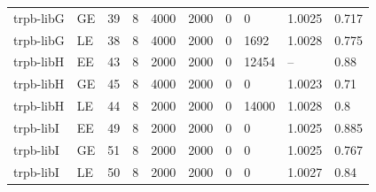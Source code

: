 \begin{longtable}[c]{llllllllll}
trpb-libG & GE & 39 & 8 & 4000 & 2000 & 0 & 0 & 1.0025 & 0.717 \\
trpb-libG & LE & 38 & 8 & 4000 & 2000 & 0 & 1692 & 1.0028 & 0.775 \\
trpb-libH & EE & 43 & 8 & 2000 & 2000 & 0 & 12454 & -- & 0.88 \\
trpb-libH & GE & 45 & 8 & 4000 & 2000 & 0 & 0 & 1.0023 & 0.71 \\
trpb-libH & LE & 44 & 8 & 2000 & 2000 & 0 & 14000 & 1.0028 & 0.8 \\
trpb-libI & EE & 49 & 8 & 2000 & 2000 & 0 & 0 & 1.0025 & 0.885 \\
trpb-libI & GE & 51 & 8 & 2000 & 2000 & 0 & 0 & 1.0025 & 0.767 \\
trpb-libI & LE & 50 & 8 & 2000 & 2000 & 0 & 0 & 1.0027 & 0.84 \\
\end{longtable}
\endgroup
\begingroup
\scriptsize
\setlength{\tabcolsep}{3pt}
